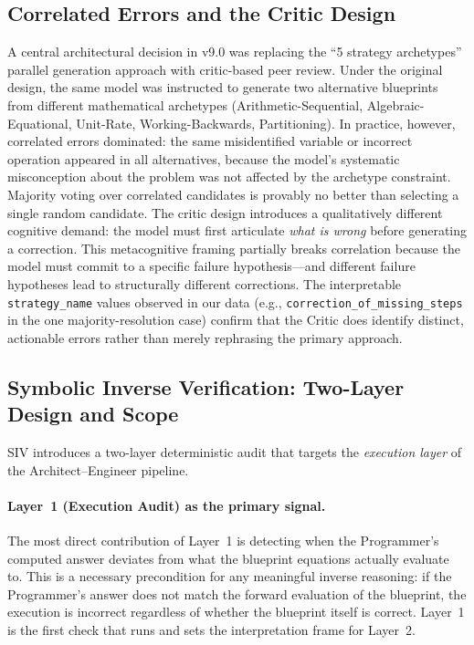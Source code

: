 \documentclass[11pt,a4paper]{article}
\begin{document}
\subsection{Correlated Errors and the Critic Design}
A central architectural decision in v9.0 was replacing the ``5 strategy archetypes'' parallel generation approach with critic-based peer review.
Under the original design, the same model was instructed to generate two alternative blueprints from different mathematical archetypes (Arithmetic-Sequential, Algebraic-Equational, Unit-Rate, Working-Backwards, Partitioning).
In practice, however, correlated errors dominated: the same misidentified variable or incorrect operation appeared in all alternatives, because the model's systematic misconception about the problem was not affected by the archetype constraint.
Majority voting over correlated candidates is provably no better than selecting a single random candidate.
The critic design introduces a qualitatively different cognitive demand: the model must first articulate \emph{what is wrong} before generating a correction.
This metacognitive framing partially breaks correlation because the model must commit to a specific failure hypothesis---and different failure hypotheses lead to structurally different corrections.
The interpretable \texttt{strategy\_name} values observed in our data (e.g., \texttt{correction\_of\_missing\_steps} in the one majority-resolution case) confirm that the Critic does identify distinct, actionable errors rather than merely rephrasing the primary approach.
\subsection{Symbolic Inverse Verification: Two-Layer Design and Scope}

SIV introduces a two-layer deterministic audit that targets the \emph{execution layer} of the Architect--Engineer pipeline.

\paragraph{Layer~1 (Execution Audit) as the primary signal.}
The most direct contribution of Layer~1 is detecting when the Programmer's computed answer deviates from what the blueprint equations actually evaluate to.
This is a necessary precondition for any meaningful inverse reasoning: if the Programmer's answer does not match the forward evaluation of the blueprint, the execution is incorrect regardless of whether the blueprint itself is correct.
Layer~1 is the first check that runs and sets the interpretation frame for Layer~2.
\end{document}

